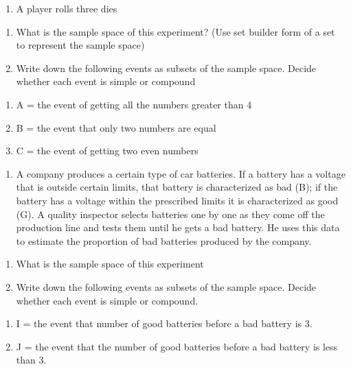 \documentclass[]{book}
\providecommand{\tightlist}{%
  \setlength{\itemsep}{0pt}\setlength{\parskip}{0pt}}
\begin{document}
\begin{enumerate}
\def\labelenumi{\arabic{enumi}.}
\setcounter{enumi}{5}
\tightlist
\item
  A player rolls three dies
\end{enumerate}

\begin{enumerate}
\def\labelenumi{(\alph{enumi})}
\tightlist
\item
  What is the sample space of this experiment? (Use set builder form of a set to represent the sample space)
\item
  Write down the following events as subsets of the sample space. Decide whether each event is simple or compound
\end{enumerate}

\begin{enumerate}
\def\labelenumi{\roman{enumi}.}
\tightlist
\item
  A = the event of getting all the numbers greater than 4
\item
  B = the event that only two numbers are equal
\item
  C = the event of getting two even numbers
\end{enumerate}

\begin{enumerate}
\def\labelenumi{\arabic{enumi}.}
\setcounter{enumi}{6}
\tightlist
\item
  A company produces a certain type of car batteries. If a battery has a voltage that is outside certain limits, that battery is characterized as bad (B); if the battery has a voltage within the prescribed limits it is characterized as good (G). A quality inspector selects batteries one by one as they come off the production line and tests them until he gets a bad battery. He uses this data to estimate the proportion of bad batteries produced by the company.
\end{enumerate}

\begin{enumerate}
\def\labelenumi{(\alph{enumi})}
\tightlist
\item
  What is the sample space of this experiment
\item
  Write down the following events as subsets of the sample space. Decide whether each event is simple or compound.
\end{enumerate}

\begin{enumerate}
\def\labelenumi{\roman{enumi}.}
\tightlist
\item
  I = the event that number of good batteries before a bad battery is 3.
\item
  J = the event that the number of good batteries before a bad battery is less
  than 3.
\end{enumerate}
\end{document}
